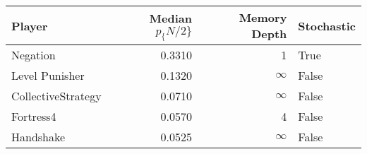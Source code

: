 \begin{tabular}{lrrl}
\toprule
             Player &  Median $p_\{N/2\}$ &  Memory Depth & Stochastic \\
\midrule
           Negation &            0.3310 &             1 &       True \\
     Level Punisher &            0.1320 &            \(\infty\) &      False \\
 CollectiveStrategy &            0.0710 &            \(\infty\) &      False \\
          Fortress4 &            0.0570 &             4 &      False \\
          Handshake &            0.0525 &            \(\infty\) &      False \\
\bottomrule
\end{tabular}
